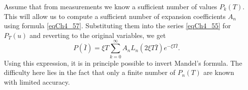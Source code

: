 Assume that from measurements we know a sufficient number of values $P_k\left(T\right)$. This will allow us to compute a sufficient number of expansion coefficients $A_n$ using formula \eqref{eqCh4_57}. Substituting them into the series \eqref{eqCh4_55} for
$P_T\left(u\right)$ and reverting to the original variables, we get
\begin{equation}
P\left(\bar{I}\right) = \xi T\sum_{k = 0}^{\infty}
A_n L_n\left(2 \xi T \bar{I}\right)e^{- \xi T \bar{I}}.
\label{eqCh4_58}
\end{equation}
Using this expression, it is in principle possible to invert Mandel's formula. The difficulty here lies in the fact that only a finite number of $P_n\left(T\right)$ are known with limited accuracy.